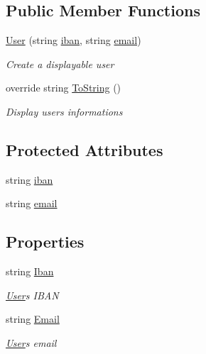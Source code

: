 \subsection*{Public Member Functions}
\begin{DoxyCompactItemize}
\item 
\mbox{\hyperlink{class_projet_banque_1_1_user_a3d3b0681eb830335e5311bb4d4caf067}{User}} (string \mbox{\hyperlink{class_projet_banque_1_1_user_a52d4f7f22889d33e196357127ceb3ec3}{iban}}, string \mbox{\hyperlink{class_projet_banque_1_1_user_a7ee066f61ff3a59b05f003709548428a}{email}})
\begin{DoxyCompactList}\small\item\em Create a displayable user \end{DoxyCompactList}\item 
override string \mbox{\hyperlink{class_projet_banque_1_1_user_ae29c534876d9b815be00cb2f2059e1a6}{To\+String}} ()
\begin{DoxyCompactList}\small\item\em Display user\textquotesingle{}s informations \end{DoxyCompactList}\end{DoxyCompactItemize}
\subsection*{Protected Attributes}
\begin{DoxyCompactItemize}
\item 
string \mbox{\hyperlink{class_projet_banque_1_1_user_a52d4f7f22889d33e196357127ceb3ec3}{iban}}
\item 
string \mbox{\hyperlink{class_projet_banque_1_1_user_a7ee066f61ff3a59b05f003709548428a}{email}}
\end{DoxyCompactItemize}
\subsection*{Properties}
\begin{DoxyCompactItemize}
\item 
string \mbox{\hyperlink{class_projet_banque_1_1_user_a39250d0a9d06279f2d45c2fe0ad6aada}{Iban}}
\begin{DoxyCompactList}\small\item\em \mbox{\hyperlink{class_projet_banque_1_1_user}{User}}\textquotesingle{}s I\+B\+AN \end{DoxyCompactList}\item 
string \mbox{\hyperlink{class_projet_banque_1_1_user_a76be7d00b6709100d0db6a3d45082971}{Email}}
\begin{DoxyCompactList}\small\item\em \mbox{\hyperlink{class_projet_banque_1_1_user}{User}}\textquotesingle{}s email \end{DoxyCompactList}\end{DoxyCompactItemize}


